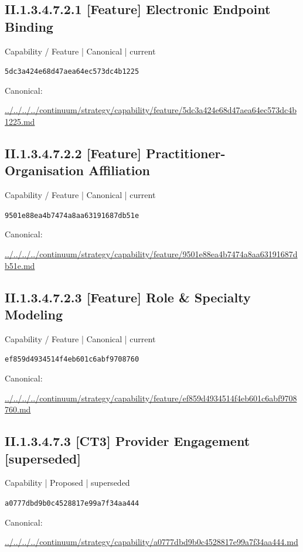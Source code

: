 \documentclass[10pt,a4paper]{article}
\begin{document}
\subsection*{II.1.3.4.7.2.1 [Feature] Electronic Endpoint Binding}
\label{element-5dc3a424e68d47aea64ec573dc4b1225}
{\small Capability / Feature | Canonical | current}\par
\texttt{5dc3a424e68d47aea64ec573dc4b1225}\par
Canonical: \par
{\footnotesize\url{../../../../continuum/strategy/capability/feature/5dc3a424e68d47aea64ec573dc4b1225.md}}\par
\subsection*{II.1.3.4.7.2.2 [Feature] Practitioner-Organisation Affiliation}
\label{element-9501e88ea4b7474a8aa63191687db51e}
{\small Capability / Feature | Canonical | current}\par
\texttt{9501e88ea4b7474a8aa63191687db51e}\par
Canonical: \par
{\footnotesize\url{../../../../continuum/strategy/capability/feature/9501e88ea4b7474a8aa63191687db51e.md}}\par
\subsection*{II.1.3.4.7.2.3 [Feature] Role \& Specialty Modeling}
\label{element-ef859d4934514f4eb601c6abf9708760}
{\small Capability / Feature | Canonical | current}\par
\texttt{ef859d4934514f4eb601c6abf9708760}\par
Canonical: \par
{\footnotesize\url{../../../../continuum/strategy/capability/feature/ef859d4934514f4eb601c6abf9708760.md}}\par
\subsection*{II.1.3.4.7.3 [CT3] Provider Engagement [superseded]}
\label{element-a0777dbd9b0c4528817e99a7f34aa444}
{\small Capability | Proposed | superseded}\par
\texttt{a0777dbd9b0c4528817e99a7f34aa444}\par
Canonical: \par
{\footnotesize\url{../../../../continuum/strategy/capability/a0777dbd9b0c4528817e99a7f34aa444.md}}\par
\end{document}
